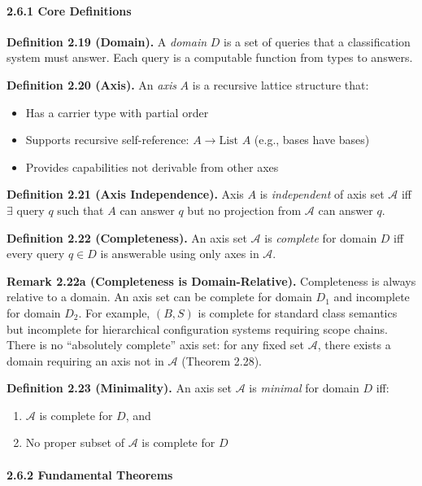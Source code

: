 \paragraph{2.6.1 Core Definitions}\label{axis-parametric-definitions}

\textbf{Definition 2.19 (Domain).} A \emph{domain} \(D\) is a set of queries that a classification system must answer. Each query is a computable function from types to answers.

\textbf{Definition 2.20 (Axis).} An \emph{axis} \(A\) is a recursive lattice structure that:
\begin{itemize}
\item Has a carrier type with partial order
\item Supports recursive self-reference: \(A \to \text{List } A\) (e.g., bases have bases)
\item Provides capabilities not derivable from other axes
\end{itemize}

\textbf{Definition 2.21 (Axis Independence).} Axis \(A\) is \emph{independent} of axis set \(\mathcal{A}\) iff \(\exists\) query \(q\) such that \(A\) can answer \(q\) but no projection from \(\mathcal{A}\) can answer \(q\).

\textbf{Definition 2.22 (Completeness).} An axis set \(\mathcal{A}\) is \emph{complete} for domain \(D\) iff every query \(q \in D\) is answerable using only axes in \(\mathcal{A}\).

\textbf{Remark 2.22a (Completeness is Domain-Relative).} Completeness is always relative to a domain. An axis set can be complete for domain \(D_1\) and incomplete for domain \(D_2\). For example, \((B, S)\) is complete for standard class semantics but incomplete for hierarchical configuration systems requiring scope chains. There is no ``absolutely complete'' axis set: for any fixed set \(\mathcal{A}\), there exists a domain requiring an axis not in \(\mathcal{A}\) (Theorem 2.28).

\textbf{Definition 2.23 (Minimality).} An axis set \(\mathcal{A}\) is \emph{minimal} for domain \(D\) iff:
\begin{enumerate}
\item \(\mathcal{A}\) is complete for \(D\), and
\item No proper subset of \(\mathcal{A}\) is complete for \(D\)
\end{enumerate}

\paragraph{2.6.2 Fundamental Theorems}\label{axis-parametric-theorems}

